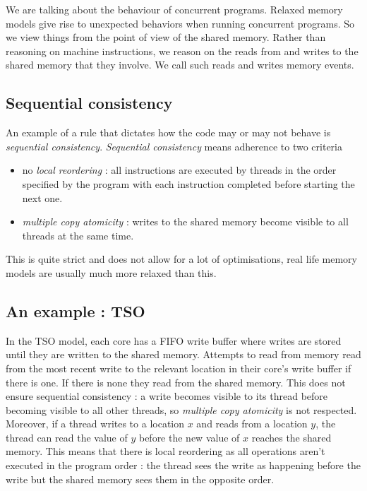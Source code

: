 \documentclass[a4,11pt]{article}
\begin{document}
We are talking about the behaviour of concurrent programs. Relaxed memory models give rise to unexpected behaviors when running concurrent programs. So we view things from the point of view of the shared memory. Rather than reasoning on machine instructions, we reason on the reads from and writes to the shared memory that they involve. We call such reads and writes memory events.

\subsection{Sequential consistency}

An example of a rule that dictates how the code may or may not behave is \emph{sequential consistency}. \emph{Sequential consistency} means adherence to two criteria 
\begin{itemize}
\item no \emph{local reordering} : all instructions are executed by threads in the order specified by the program with each instruction completed before starting the next one.
\item \emph{multiple copy atomicity} : writes to the shared memory become visible to all threads at the same time.
\end{itemize}
This is quite strict and does not allow for a lot of optimisations, real life memory models are usually much more relaxed than this.

\subsection{An example : TSO}

In the TSO model, each core has a FIFO write buffer where writes are stored until they are written to the shared memory. Attempts to read from memory read from the most recent write to the relevant location in their core's write buffer if there is one. If there is none they read from the shared memory. This does not ensure sequential consistency : a write becomes visible to its thread before becoming visible to all other threads, so \emph{multiple copy atomicity} is not respected. Moreover, if a thread writes to a location $x$ and reads from a location $y$, the thread can read the value of $y$ before the new value of $x$ reaches the shared memory. This means that there is local reordering as all operations aren't executed in the program order : the thread sees the write as happening before the write but the shared memory sees them in the opposite order.
\end{document}
